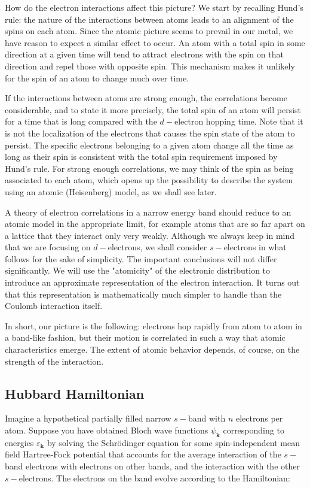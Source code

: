 How do the electron interactions affect this picture? We start by recalling Hund's rule: the nature of the  interactions between atoms leads to an alignment of the spins on each atom. Since the atomic picture seems to prevail in our metal, we have reason to expect a similar effect to occur. An atom with a total spin in some direction at a given time will tend to attract electrons with the spin on that direction and repel those with opposite spin. This mechanism makes it unlikely for the spin of an atom to change much over time.

If the interactions between atoms are strong enough, the correlations become considerable, and to state it more precisely, the total spin of an atom will persist for a time that is long compared with the $d-$electron hopping time. Note that it is not the localization of the electrons that causes the spin state of the atom to persist. The specific electrons belonging to a given atom change all the time as long as their spin is consistent with the total spin requirement imposed by Hund's rule. For strong enough correlations, we may think of the spin as being associated to each atom, which opens up the possibility to describe the system using an atomic (Heisenberg) model, as we shall see later.

A theory of electron correlations in a narrow energy band should reduce to an atomic model in the appropriate limit, for example atoms that are so far apart on a lattice that they interact only very weakly. Although we always keep in mind that we are focusing on $d-$electrons, we shall consider $s-$electrons in what follows for the sake of simplicity. The important conclusions will not differ significantly. We will use the "atomicity" of the electronic distribution to introduce an approximate representation of the electron interaction. It turns out that this representation is mathematically much simpler to handle than the Coulomb interaction itself.

In short, our picture is the following: electrons hop rapidly from atom to atom in a band-like fashion, but their motion is correlated in such a way that atomic characteristics emerge. The extent of atomic behavior depends, of course, on the strength of the interaction.

\subsection{Hubbard Hamiltonian}\label{hubbardHamiltonian}

Imagine a hypothetical partially filled narrow $s-$band with $n$ electrons per atom. Suppose you have obtained Bloch wave functions $\psi_{\bm k}$ corresponding to energies $\varepsilon_{\bm k}$ by solving the Schr\"odinger equation for some spin-independent mean field Hartree-Fock potential that accounts for the average interaction of the $s-$band electrons with electrons on other bands, and the interaction with the other $s-$electrons. The electrons on the band evolve according to the Hamiltonian:

